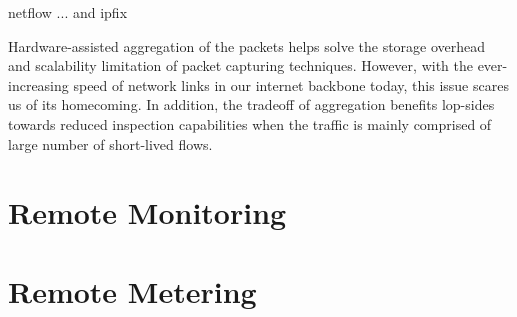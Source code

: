 netflow {...} and ipfix \cite{...} 

Hardware-assisted aggregation of the packets helps solve the storage overhead and scalability limitation of packet capturing techniques. However, with the ever-increasing  speed of network links in our internet backbone today, this issue scares us of its homecoming. In addition, the tradeoff of aggregation benefits lop-sides towards reduced inspection capabilities when the traffic is mainly comprised of large number of short-lived flows. 


\section{Remote Monitoring}\label{sec:remote-monitoring}
\section{Remote Metering}\label{sec:remote-metering}